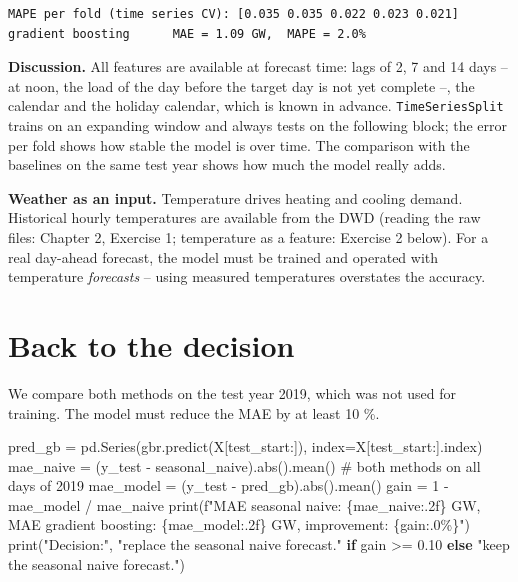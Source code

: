\documentclass[
  letterpaper,
  DIV=11,
  numbers=noendperiod]{scrreprt}
\newenvironment{Shaded}{\begin{snugshade}}{\end{snugshade}}
\newcommand{\BuiltInTok}[1]{\textcolor[rgb]{0.00,0.23,0.31}{#1}}
\newcommand{\CommentTok}[1]{\textcolor[rgb]{0.37,0.37,0.37}{#1}}
\newcommand{\ControlFlowTok}[1]{\textcolor[rgb]{0.00,0.23,0.31}{\textbf{#1}}}
\newcommand{\DecValTok}[1]{\textcolor[rgb]{0.68,0.00,0.00}{#1}}
\newcommand{\FloatTok}[1]{\textcolor[rgb]{0.68,0.00,0.00}{#1}}
\newcommand{\NormalTok}[1]{\textcolor[rgb]{0.00,0.23,0.31}{#1}}
\newcommand{\OperatorTok}[1]{\textcolor[rgb]{0.37,0.37,0.37}{#1}}
\newcommand{\SpecialCharTok}[1]{\textcolor[rgb]{0.37,0.37,0.37}{#1}}
\newcommand{\SpecialStringTok}[1]{\textcolor[rgb]{0.13,0.47,0.30}{#1}}
\newcommand{\StringTok}[1]{\textcolor[rgb]{0.13,0.47,0.30}{#1}}
\begin{document}
\begin{verbatim}
MAPE per fold (time series CV): [0.035 0.035 0.022 0.023 0.021]
gradient boosting      MAE = 1.09 GW,  MAPE = 2.0%
\end{verbatim}

\textbf{Discussion.} All features are available at forecast time: lags
of 2, 7 and 14 days -- at noon, the load of the day before the target
day is not yet complete --, the calendar and the holiday calendar, which
is known in advance. \texttt{TimeSeriesSplit} trains on an expanding
window and always tests on the following block; the error per fold shows
how stable the model is over time. The comparison with the baselines on
the same test year shows how much the model really adds.

\textbf{Weather as an input.} Temperature drives heating and cooling
demand. Historical hourly temperatures are available from the DWD
(reading the raw files: Chapter 2, Exercise 1; temperature as a feature:
Exercise 2 below). For a real day-ahead forecast, the model must be
trained and operated with temperature \emph{forecasts} -- using measured
temperatures overstates the accuracy.

\section{Back to the decision}\label{back-to-the-decision-10}

We compare both methods on the test year 2019, which was not used for
training. The model must reduce the MAE by at least 10 \%.

\begin{Shaded}
\begin{Highlighting}[]
\NormalTok{pred\_gb }\OperatorTok{=}\NormalTok{ pd.Series(gbr.predict(X[test\_start:]), index}\OperatorTok{=}\NormalTok{X[test\_start:].index)}
\NormalTok{mae\_naive }\OperatorTok{=}\NormalTok{ (y\_test }\OperatorTok{{-}}\NormalTok{ seasonal\_naive).}\BuiltInTok{abs}\NormalTok{().mean()         }\CommentTok{\# both methods on all days of 2019}
\NormalTok{mae\_model }\OperatorTok{=}\NormalTok{ (y\_test }\OperatorTok{{-}}\NormalTok{ pred\_gb).}\BuiltInTok{abs}\NormalTok{().mean()}
\NormalTok{gain }\OperatorTok{=} \DecValTok{1} \OperatorTok{{-}}\NormalTok{ mae\_model }\OperatorTok{/}\NormalTok{ mae\_naive}
\BuiltInTok{print}\NormalTok{(}\SpecialStringTok{f"MAE seasonal naive: }\SpecialCharTok{\{}\NormalTok{mae\_naive}\SpecialCharTok{:.2f\}}\SpecialStringTok{ GW,  MAE gradient boosting: }\SpecialCharTok{\{}\NormalTok{mae\_model}\SpecialCharTok{:.2f\}}\SpecialStringTok{ GW,  improvement: }\SpecialCharTok{\{}\NormalTok{gain}\SpecialCharTok{:.0\%\}}\SpecialStringTok{"}\NormalTok{)}
\BuiltInTok{print}\NormalTok{(}\StringTok{"Decision:"}\NormalTok{, }\StringTok{"replace the seasonal naive forecast."} \ControlFlowTok{if}\NormalTok{ gain }\OperatorTok{\textgreater{}=} \FloatTok{0.10} \ControlFlowTok{else} \StringTok{"keep the seasonal naive forecast."}\NormalTok{)}
\end{Highlighting}
\end{Shaded}
\end{document}
